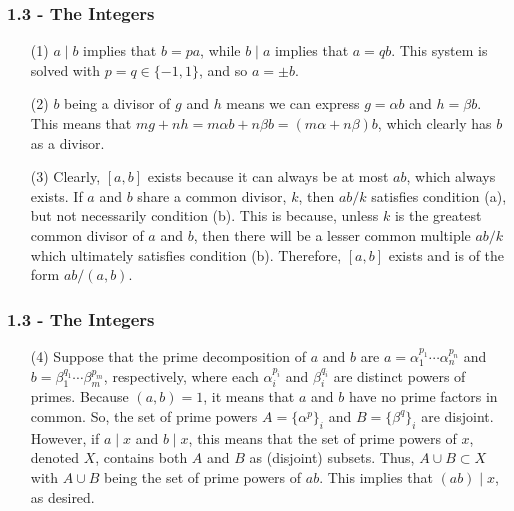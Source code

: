 \documentclass{beamer}
\begin{document}
\begin{frame}
\frametitle{1.3 - The Integers}
\small
\begin{enumerate}
	\item[(1)] $a\mid b$ implies that $b=pa$, while $b\mid a$ implies that $a=qb$. This system is solved with $p=q\in\{-1, 1\}$, and so $a=\pm b$.
	\item[(2)] $b$ being a divisor of $g$ and $h$ means we can express $g=\alpha b$ and $h=\beta b$. This means that $mg + nh = m\alpha b + n\beta b = (m\alpha + n\beta)b$, which clearly has $b$ as a divisor.
	\item[(3)] Clearly, $\left[a, b\right]$ exists because it can always be at most $ab$, which always exists. If $a$ and $b$ share a common divisor, $k$, then $ab/k$ satisfies condition (a), but not necessarily condition (b). This is because, unless $k$ is the greatest common divisor of $a$ and $b$, then there will be a lesser common multiple $ab/k$ which ultimately satisfies condition (b). Therefore, $\left[a, b\right]$ exists and is of the form $ab/(a,b)$.
\end{enumerate}
\end{frame}
\begin{frame}
\frametitle{1.3 - The Integers}
\small
\begin{enumerate}
	\item[(4)] Suppose that the prime decomposition of $a$ and $b$ are $a = \alpha_1^{p_1}\cdots\alpha_n^{p_n}$ and $b = \beta_1^{q_1}\cdots\beta_m^{p_m}$, respectively, where each $\alpha_i^{p_i}$ and $\beta_i^{q_i}$ are distinct powers of primes. Because $(a,b) = 1$, it means that $a$ and $b$ have no prime factors in common. So, the set of prime powers $A = \{\alpha^p\}_i$ and $B = \{\beta^q\}_i$ are disjoint. However, if $a\mid x$ and $b\mid x$, this means that the set of prime powers of $x$, denoted $X$, contains both $A$ and $B$ as (disjoint) subsets. Thus, $A\cup B \subset X$ with $A\cup B$ being the set of prime powers of $ab$. This implies that $(ab)\mid x$, as desired.
\end{enumerate}
\end{frame}
\end{document}
